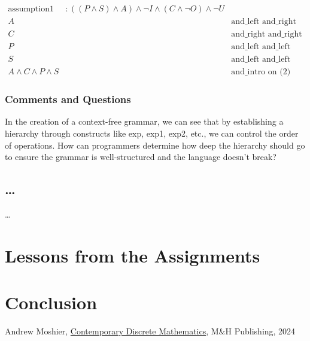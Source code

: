 \documentclass{article}
\theoremstyle{theorem}
\theoremstyle{definition}
\theoremstyle{remark}
\begin{document}
\begin{align}
  \text{assumption1} &: ((P \wedge S) \wedge A) \wedge \neg I \wedge (C \wedge \neg O) \wedge \neg U & \text{} \\
  A && \text{and\_left and\_right on (1)} \\
  C && \text{and\_right and\_right and\_left and\_left on (1)} \\
  P && \text{and\_left and\_left and\_left on (1)} \\
  S && \text{and\_left and\_left and\_right on (1)} \\
  A \wedge C \wedge P \wedge S && \text{and\_intro on (2) (3) (4) (5)}
\end{align}

\subsubsection{Comments and Questions}

In the creation of a context-free grammar, we can see that by establishing a hierarchy through constructs like exp, exp1, exp2, etc., we can control the order of operations. How can programmers determine how deep the hierarchy should go to ensure the grammar is well-structured and the language doesn't break?

\subsection{\ldots}

\ldots

\section{Lessons from the Assignments}

\section{Conclusion}\label{conclusion}

\begin{thebibliography}{99}
 Andrew Moshier, \href{https://canvas.chapman.edu/courses/66029/files/6581500?module_item_id=2280521}{Contemporary Discrete Mathematics}, M\&H Publishing, 2024
\end{thebibliography}
\end{document}
